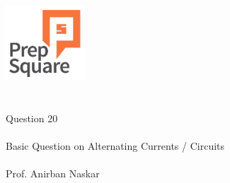 \documentclass{beamer}
\begin{document}
\begin{center}
\ \\ \ \\
\includegraphics[width=30mm]{Logo-final.png} \\
\ \\ \ \\ 
{\huge Question 20 \\ \ \\ }
{\Large
Basic Question on Alternating Currents / Circuits
}
{\large \ \\ \ \\ Prof. Anirban Naskar }
\end{center}
\end{document}
